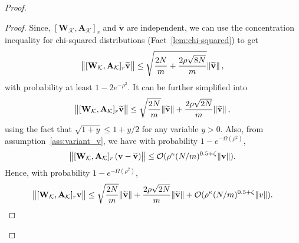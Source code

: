 \begin{proof}
\begin{proof}
		Since, $[\mathbf{W}_{\mathcal{K}}, \mathbf{A}_{\mathcal{K}}]_r$ and $\widetilde{\mathbf{v}}$ are independent, we can use the concentration inequality for chi-squared distributions (Fact~\ref{lem:chi-squared}) to get
		\begin{align*}
			\norm{[\mathbf{W}_{\mathcal{K}}, \mathbf{A}_{\mathcal{K}}]_r \widetilde{\mathbf{v}}} \leq \sqrt{\frac{2N}{m} + \frac{2\rho \sqrt{8N}}{m}} \norm{\widetilde{\mathbf{v}}},
		\end{align*}
		with probability at least $1-2e^{-\rho^2}$. It can be further simplified into 
		\begin{equation*}
			\norm{[\mathbf{W}_{\mathcal{K}}, \mathbf{A}_{\mathcal{K}}]_r \widetilde{\mathbf{v}}} \leq \sqrt{\frac{2N}{m}} \norm{\widetilde{\mathbf{v}}} + \frac{2\rho \sqrt{2N}}{m} \norm{\widetilde{\mathbf{v}}},
		\end{equation*}
		using the fact that $\sqrt{1 + y} \le 1 + y/2$ for any variable $y > 0$. 
		Also, from assumption~\ref{ass:variant_v}, we have with probability $1-e^{-\Omega(\rho^2)}$,
		\begin{align*}
			\norm{[\mathbf{W}_{\mathcal{K}}, \mathbf{A}_{\mathcal{K}}]_r \left(\mathbf{v} - \widetilde{\mathbf{v}}\right)} \le \mathcal{O}(\rho^{\kappa} (N/m)^{0.5 + \zeta} \norm{\mathbf{v}}).
		\end{align*}
		Hence, with probability $1 - e^{-\Omega(\rho^2)}$,
		\begin{align*}
			\norm{[\mathbf{W}_{\mathcal{K}}, \mathbf{A}_{\mathcal{K}}]_r \mathbf{v}} \le \sqrt{\frac{2N}{m}} \norm{\widetilde{\mathbf{v}}} + \frac{2\rho \sqrt{2N}}{m} \norm{\widetilde{\mathbf{v}}} + \mathcal{O}(\rho^{ \kappa} (N/m)^{0.5 + \zeta} \norm{v}).
		\end{align*}
		

\end{proof}
\end{proof}
